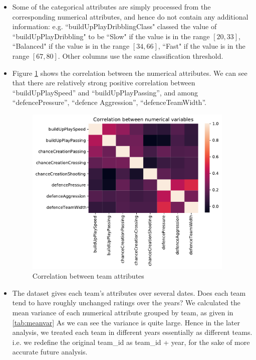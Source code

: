 \documentclass[12pt, a4paper]{article}
\begin{document}
\begin{itemize}
    \item Some of the categorical attributes are simply processed from the corresponding numerical attributes, and hence do not contain any additional information: e.g. ``buildUpPlayDribblingClass" classed the value of ``buildUpPlayDribbling" to be ``Slow" if the value is in the range $[20,33]$, ``Balanced" if the value is in the range $[34, 66]$,  ``Fast" if the value is in the range $[67,80]$. Other columns use the same classification threshold.
    \item Figure \ref{fig:corr} shows the correlation between the numerical attributes. We can see that there are relatively strong positive correlation between ``buildUpPlaySpeed'' and ``buildUpPlayPassing'', and among ``defencePressure'', ``defence Aggression'', ``defenceTeamWidth''.
    \begin{figure}[!ht]
        \centering
        \includegraphics[width=10cm]{corr.pdf}
        \caption{Correlation between team attributes}
        \label{fig:corr}
    \end{figure}
    
    \item The dataset gives each team's attributes over several dates. Does each team tend to have roughly unchanged ratings over the years? We calculated the mean variance of each numerical attribute grouped by team, as given in \ref{tab:meanvar} As we can see the variance is quite large. Hence in the later analysis, we treated each team in different years essentially as different teams. i.e. we redefine the original team\_id as team\_id + year, for the sake of more accurate future analysis. 
    

\end{itemize}
\end{document}
